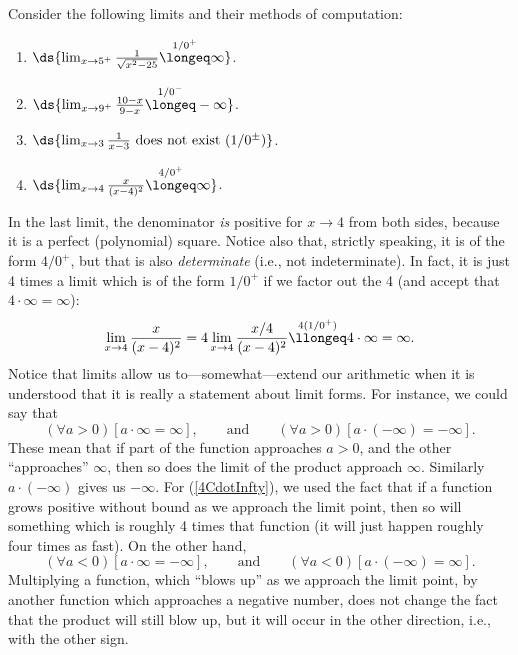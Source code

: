 \bex Consider the following limits and their methods of computation:
\begin{enumerate}
\item $\ds{\lim_{x\to5^+}\frac1{\sqrt{x^2-25}}
   \overset{1/0^+}\longeq\infty}$.
\item $\ds{\lim_{x\to9^+}\frac{10-x}{9-x}
    \overset{1/0^-}\longeq-\infty}$.
\item $\ds{\lim_{x\to3}\frac{1}{x-3}
    \text{ does not exist }(1/0^\pm)}$.
\item $\ds{\lim_{x\to4}\frac{x}{(x-4)^2}
    \overset{4/0^+}\longeq\infty}$.
\end{enumerate}
\eex
In the last limit, the denominator {\it is} positive for $x\to4$
from both sides, because it is a perfect (polynomial) square.
Notice also that, strictly speaking, it is of the form
$4/0^+$, but that is also {\it determinate} (i.e., not indeterminate).  
In fact, it
is just 4 times a limit which is of the form $1/0^+$
if we factor out the 4 (and accept that $4\cdot\infty=\infty$):
\begin{equation}\lim_{x\to4}\frac{x}{(x-4)^2}
=4\lim_{x\to4}\frac{x/4}{(x-4)^2}
\overset{4(1/0^+)}\llongeq4\cdot\infty=\infty.\label{4CdotInfty}
\end{equation}
Notice that limits allow us to---somewhat---extend
our arithmetic when it is understood that it is 
really a statement about limit forms.   For instance,
we could say that
\begin{equation}
(\forall a>0)[a\cdot\infty=\infty],\qquad\text{and}\qquad
            (\forall a>0)[a\cdot(-\infty)=-\infty].
\end{equation}
These mean that if part of the function approaches $a>0$,
and the other ``approaches'' $\infty$, then so does the 
limit of the product approach $\infty$. Similarly $a\cdot(-\infty)$
gives us $-\infty$. 
For (\ref{4CdotInfty}), we used the fact that  if a function
grows positive without bound as we approach the limit point,
then so will something which is roughly
4 times that function (it will just happen
roughly four times as fast).  On the other hand,
\begin{equation}
(\forall a<0)[a\cdot\infty=-\infty],\qquad\text{and}\qquad
            (\forall a<0)[a\cdot(-\infty)=\infty].
\end{equation}
Multiplying a function, which ``blows up'' as we approach
the limit point, by another function which approaches
a negative number, does not change the fact that the product
will still blow up, but it will occur in the other direction,
i.e., with the other sign.

